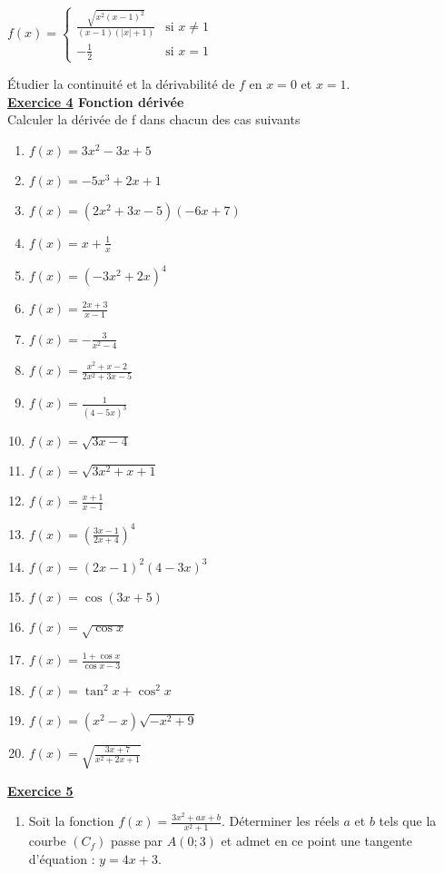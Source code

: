 \documentclass[12pt,a4paper]{article}
\begin{document}
\begin{multicols}{2}
\( f(x) = 
\begin{cases}
    \frac{\sqrt{x^2(x - 1)^2}}{(x - 1)(|x| + 1)} & \text{si } x \neq 1 \\
    -\frac{1}{2} & \text{si } x = 1
\end{cases} \)

Étudier la continuité et la dérivabilité de \( f \) en \( x = 0 \) et \( x = 1 \).\\
\textbf{\underline{Exercice 4} Fonction dérivée}\\
Calculer la dérivée de f dans chacun des cas suivants
\begin{enumerate}
    \item \( f(x) = 3x^2 - 3x + 5 \)
    \item \( f(x) = -5x^3 + 2x + 1 \)
    \item \( f(x) = (2x^2 + 3x - 5)(-6x + 7) \)
    \item \( f(x) = x + \frac{1}{x} \)
    \item \( f(x) = \left( -3x^2 + 2x \right)^4 \)
    \item \( f(x) = \frac{2x + 3}{x - 1} \)
    \item \( f(x) = -\frac{3}{x^2 - 4} \)
    \item \( f(x) = \frac{x^2 + x - 2}{2x^2 + 3x - 5} \)
    \item \( f(x) = \frac{1}{(4 - 5x)^3} \)
    \item \( f(x) = \sqrt{3x - 4} \)
    \item \( f(x) = \sqrt{3x^2 + x + 1} \)
    \item \( f(x) = \frac{x + 1}{x - 1} \)
    \item \( f(x) = \left( \frac{3x - 1}{2x + 4} \right)^4 \)
    \item \( f(x) = (2x - 1)^2(4 - 3x)^3 \)
    \item \( f(x) = \cos(3x + 5) \)
    \item \( f(x) = \sqrt{\cos x} \)
    \item \( f(x) = \frac{1 + \cos x}{\cos x - 3} \)
    \item \( f(x) = \tan^2 x + \cos^2 x \)
    \item \( f(x) = (x^2-x)\sqrt{-x^2 + 9} \)
    \item \( f(x) = \sqrt{\frac{3x + 7}{x^2 + 2x + 1}} \)
\end{enumerate}
\textbf{\underline{Exercice 5}}
\begin{enumerate}
    \item Soit la fonction \( f(x) = \frac{3x^2 + ax + b}{x^2 + 1} \). Déterminer les réels \( a \) et \( b \) tels que la courbe \( (C_f) \) passe par \( A(0;3) \) et admet en ce point une tangente d'équation : \( y = 4x + 3 \).
    

\end{enumerate}
\end{multicols}
\end{document}
